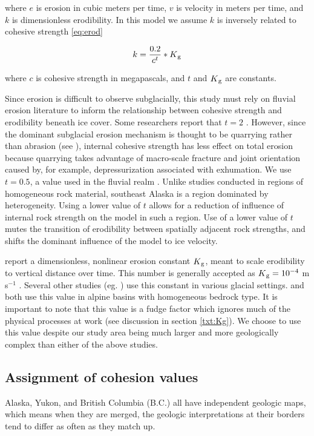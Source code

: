 \documentclass[twocolumn]{aastex6}
\begin{document}
		\noindent where $e$ is erosion in cubic meters per time, $v$ is velocity in meters per time, and $k$ is dimensionless erodibility. In this model we assume $k$ is inversely related to cohesive strength \eqref{eq:erod}
		
		\begin{equation} \label{eq:erod}
			k = \frac{0.2}{c ^ {t}} * K\textsubscript{g}
		\end{equation}
		
		\noindent where $c$ is cohesive strength in megapascals, and $t$ and $K\textsubscript{g}$ are constants.
		
		Since erosion is difficult to observe subglacially, this study must rely on fluvial erosion literature to inform the relationship between cohesive strength and erodibility beneath ice cover. Some researchers report that $t = 2$ \citep{Sklar2001,Stock2005}. However, since the dominant subglacial erosion mechanism is thought to be quarrying rather than abrasion (see \citealt{Iverson2012,Hooyer2012}), internal cohesive strength has less effect on total erosion because quarrying takes advantage of macro-scale fracture and joint orientation caused by, for example, depressurization associated with exhumation. We use $t = 0.5$, a value used in the fluvial realm \citep{Hanson2001,Roy2015}. Unlike studies conducted in regions of homogeneous rock material, southeast Alaska is a region dominated by heterogeneity. Using a lower value of $t$ allows for a reduction of influence of internal rock strength on the model in such a region. Use of a lower value of $t$ mutes the transition of erodibility between spatially adjacent rock strengths, and shifts the dominant influence of the model to ice velocity.
		
		\citet{Humphrey1994} report a dimensionless, nonlinear erosion constant $K\textsubscript{g}$, meant to scale erodibility to vertical distance over time. This number is generally accepted as $K\textsubscript{g} = 10^{-4}$ m s$^{-1}$ \citep{Humphrey1994}. Several other studies (eg. \citealt{Riihimaki2005,Herman2015}) use this constant in various glacial settings. \citet{Riihimaki2005} and \citet{Herman2015} both use this value in alpine basins with homogeneous bedrock type. It is important to note that this value is a fudge factor which ignores much of the physical processes at work (see discussion in section \ref{txt:Kg}). We choose to use this value despite our study area being much larger and more geologically complex than either of the above studies.		

	\subsection{Assignment of cohesion values}
		Alaska, Yukon, and British Columbia (B.C.) all have independent geologic maps, which means when they are merged, the geologic interpretations at their borders tend to differ as often as they match up.
\end{document}
